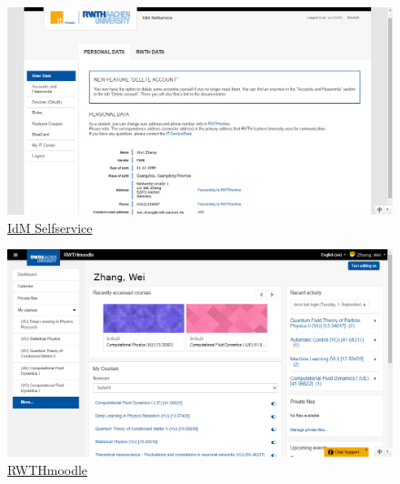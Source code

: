     \begin{figure}[H]
      \centering
      \includegraphics[width=\textwidth]{初来乍到/Management_System/idm.png}
      \caption{\href{https://idm.rwth-aachen.de/selfservice}{IdM Selfservice}}
      \label{fig:IdM Selfservice}
    \end{figure}

    \begin{figure}[H]
      \centering
      \includegraphics[width=\textwidth]{初来乍到/Management_System/RWTHmoodle.png}
      \caption{\href{https://moodle.rwth-aachen.de/}{RWTHmoodle}}
      \label{fig:RWTHmoodle}
    \end{figure}

